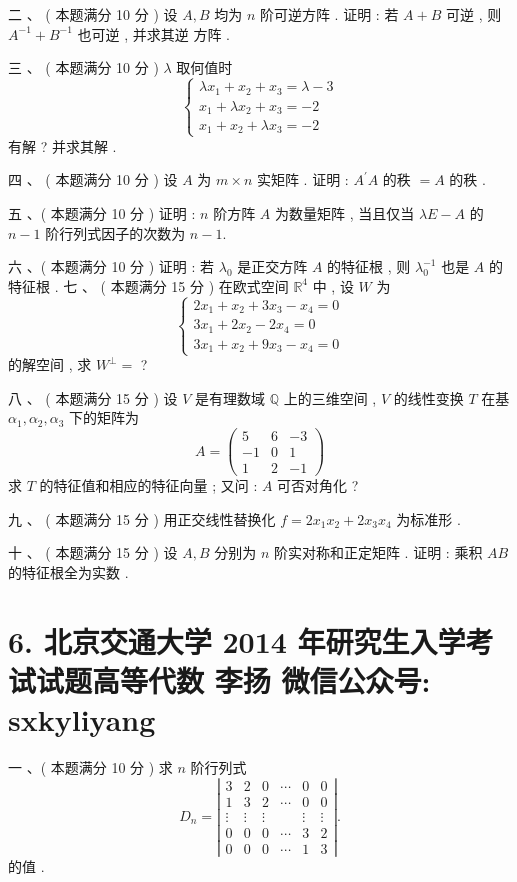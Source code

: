 \documentclass[10pt]{article}
\begin{document}
{\begin{enumerate}
\end{enumerate}
 二 、 ( 本题满分  10  分 )  设  $A, B$  均为  $n$  阶可逆方阵 .  证明 :  若  $A+B$  可逆 ,  则  $A^{-1}+B^{-1}$  也可逆 ,  并求其逆   方阵 .

 三 、 ( 本题满分  10  分 ) $\lambda$  取何值时 
$$
\left\{\begin{array}{l}
\lambda x_{1}+x_{2}+x_{3}=\lambda-3 \\
x_{1}+\lambda x_{2}+x_{3}=-2 \\
x_{1}+x_{2}+\lambda x_{3}=-2
\end{array}\right.
$$
 有解 ?  并求其解 .

 四 、 ( 本题满分  10  分 )  设  $A$  为  $m \times n$  实矩阵 .  证明 : $A^{\prime} A$  的秩  $=A$  的秩 .

 五 、( 本题满分  10  分 )  证明 : $n$  阶方阵  $A$  为数量矩阵 ,  当且仅当  $\lambda E-A$  的  $n-1$  阶行列式因子的次数为  $n-1$.

 六 、( 本题满分  10  分 )  证明 :  若  $\lambda_{0}$  是正交方阵  $A$  的特征根 ,  则  $\lambda_{0}^{-1}$  也是  $A$  的特征根 .  七 、 ( 本题满分  15  分 )  在欧式空间  $\mathbb{R}^{4}$  中 ,  设  $W$  为 
$$
\left\{\begin{array}{l}
2 x_{1}+x_{2}+3 x_{3}-x_{4}=0 \\
3 x_{1}+2 x_{2}-2 x_{4}=0 \\
3 x_{1}+x_{2}+9 x_{3}-x_{4}=0
\end{array}\right.
$$
 的解空间 ,  求  $W^{\perp}=$ ?

 八 、 ( 本题满分  15  分 )  设  $V$  是有理数域  $\mathbb{Q}$  上的三维空间 , $V$  的线性变换  $T$  在基  $\alpha_{1}, \alpha_{2}, \alpha_{3}$  下的矩阵为 
$$
A=\left(\begin{array}{ccc}
5 & 6 & -3 \\
-1 & 0 & 1 \\
1 & 2 & -1
\end{array}\right)
$$
 求  $T$  的特征值和相应的特征向量 ;  又问 : $A$  可否对角化 ?

 九 、 ( 本题满分  15  分 )  用正交线性替换化  $f=2 x_{1} x_{2}+2 x_{3} x_{4}$  为标准形 .

 十 、 ( 本题满分  15  分 )  设  $A, B$  分别为  $n$  阶实对称和正定矩阵 .  证明 :  乘积  $A B$  的特征根全为实数 .

\section{6. 北京交通大学 2014 年研究生入学考试试题高等代数 
 李扬 
 微信公众号: sxkyliyang}
 一 、( 本题满分  10  分 )  求  $n$  阶行列式 
$$
D_{n}=\left|\begin{array}{cccccc}
3 & 2 & 0 & \cdots & 0 & 0 \\
1 & 3 & 2 & \cdots & 0 & 0 \\
\vdots & \vdots & \vdots & & \vdots & \vdots \\
0 & 0 & 0 & \cdots & 3 & 2 \\
0 & 0 & 0 & \cdots & 1 & 3
\end{array}\right| .
$$
 的值 .

}
\end{document}
